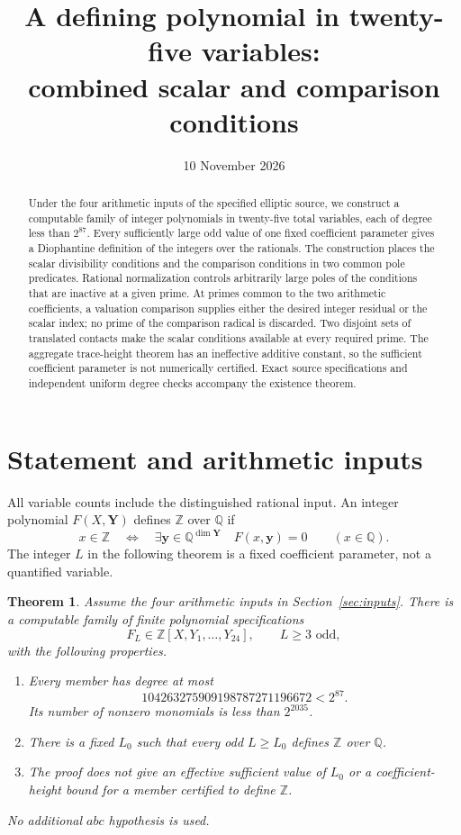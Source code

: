 \documentclass[11pt,a4paper]{article}
\title{A defining polynomial in twenty-five variables:\\
combined scalar and comparison conditions}
\author{}\date{10 November 2026}
\newtheorem{theorem}{Theorem}[section]
\newcommand{\Q}{\mathbb Q}\newcommand{\Z}{\mathbb Z}
\begin{document}
\maketitle
\begin{abstract}
Under the four arithmetic inputs of the specified elliptic source,
we construct a computable family of integer polynomials in twenty-five
total variables, each of degree less than $2^{87}$. Every sufficiently
large odd value of one fixed coefficient parameter gives a Diophantine
definition of the integers over the rationals. The construction places
the scalar divisibility conditions and the comparison conditions in two
common pole predicates. Rational normalization controls arbitrarily
large poles of the conditions that are inactive at a given prime.
At primes common to the two arithmetic coefficients, a valuation
comparison supplies either the desired integer residual or the scalar
index; no prime of the comparison radical is discarded. Two disjoint
sets of translated contacts make the scalar conditions available at
every required prime. The aggregate trace-height theorem has an
ineffective additive constant, so the sufficient coefficient parameter
is not numerically certified. Exact source specifications and independent
uniform degree checks accompany the existence theorem.
\end{abstract}

\section{Statement and arithmetic inputs}

All variable counts include the distinguished rational input. An integer
polynomial $F(X,\mathbf Y)$ defines $\Z$ over $\Q$ if
\[
 x\in\Z\quad\Longleftrightarrow\quad
 \exists\mathbf y\in\Q^{\dim\mathbf Y}\quad F(x,\mathbf y)=0
 \qquad(x\in\Q).
\]
The integer $L$ in the following theorem is a fixed coefficient
parameter, not a quantified variable.

\begin{theorem}\label{thm:main}
Assume the four arithmetic inputs in Section~\ref{sec:inputs}.
There is a computable family of finite polynomial specifications
\[
 F_L\in\Z[X,Y_1,\ldots,Y_{24}],\qquad L\ge3\text{ odd},
\]
with the following properties.
\begin{enumerate}
\item Every member has degree at most
\[
 104263275909198787271196672<2^{87}.
\]
Its number of nonzero monomials is less than $2^{2035}$.
\item There is a fixed $L_0$ such that every odd $L\ge L_0$
defines $\Z$ over $\Q$.
\item The proof does not give an effective sufficient value of $L_0$
or a coefficient-height bound for a member certified to define $\Z$.
\end{enumerate}
No additional $abc$ hypothesis is used.
\end{theorem}
\end{document}
